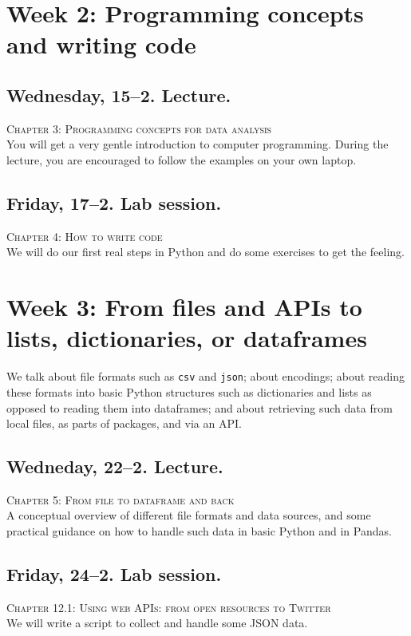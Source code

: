 
\section*{Week 2: Programming concepts and writing code}

\subsection*{Wednesday, 15--2. Lecture.}
\textsc{ Chapter 3: Programming concepts for data analysis}\\
You will get a very gentle introduction to computer programming. During the lecture, you are encouraged to follow the examples on your own laptop.


\subsection*{Friday, 17--2. Lab session.}
\textsc{ Chapter 4: How to write code}\\
We will do our first real steps in Python and do some exercises to get the feeling.



\section*{Week 3: From files and APIs to lists, dictionaries, or dataframes}
We talk about file formats such as \texttt{csv} and \texttt{json}; about encodings; about reading these formats into basic Python structures such as dictionaries and lists as opposed to reading them into dataframes; and about retrieving such data from local files, as parts of packages, and via an API.


\subsection*{Wedneday, 22--2. Lecture.}
\textsc{ Chapter 5: From file to dataframe and back}\\
A conceptual overview of different file formats and data sources, and some practical guidance on how to handle such data in basic Python and in Pandas.

\subsection*{Friday, 24--2. Lab session.}
\textsc{ Chapter 12.1: Using web APIs: from open resources to Twitter}\\
We will write a script to collect and handle some JSON data.


